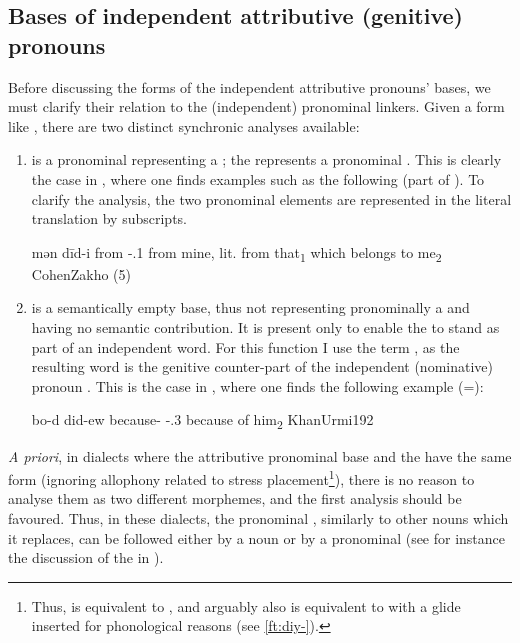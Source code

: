 \subsection{Bases of independent attributive (genitive) pronouns} \label{ss:pron_base}

Before discussing the forms of the independent attributive pronouns' bases, we must clarify their relation to the (independent) pronominal linkers. Given a form like , there are two distinct synchronic analyses available:

\begin{enumerate}

\item {} is a pronominal \lnk* representing a \prim; the  \mbox{} represents a pronominal \secn. This is clearly the case in \JZax, where one finds examples such as the following (part of ). To clarify the analysis, the two pronominal elements are represented in the literal translation by subscripts.

{mən dīd-i}
{from \lnk-\poss.1\sg}
{from mine, lit. from that\textsubscript{1} which belongs to me\textsubscript{2}}
{CohenZakho}{ (5)}


\item {} is a semantically empty base, thus not representing pronominally a \prim and having no semantic contribution. It is present only to enable the   to stand as part of an independent word. For this function I use the term , as the resulting word is the genitive counter-part of the independent (nominative) pronoun . This is the case in \JUrm, where one finds the following example (=):

{bo-d\cb{} did-ew}
{because-\cst\cb{} \gen-\poss.3\masc}
{because of him\textsubscript{2}}
{KhanUrmi}{192}

\end{enumerate}

\textit{A priori}, in dialects where the attributive pronominal base and the \lnk* have the same form (ignoring allophony related to stress placement\footnote{Thus,  is equivalent to , and arguably also  is equivalent to  with a glide inserted for phonological reasons (see \vref{ft:diy-}).}), there is no reason to analyse them as two different morphemes, and the first analysis should be favoured. Thus, in these dialects, the pronominal \lnk*, similarly to other nouns which it replaces, can be followed either by a noun or by a pronominal  (see for instance the discussion of the \JZax \lnk* in ). 

